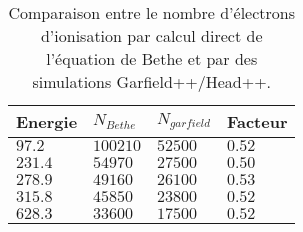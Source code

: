\begin{table}[ht]%
	\centering
	\caption[]
	{Comparaison entre le nombre d'électrons d'ionisation par calcul direct de l'équation de Bethe et par des simulations Garfield++/Head++.}
	\label{sumfr:table:GarfieldBethe}
	\begin{tabularx}{\linewidth}{XXXX}
		\toprule
		Energie    & \(N_{Bethe}\) & \(N_{garfield}\) & Facteur \\
		\midrule
		\(97.2\)  & \(100210\)    & \(52500\)             & \(0.52\)   \\
		\(231.4\) & \(54970\)     & \(27500\)             & \(0.50\)   \\
		\(278.9\) & \(49160\)     & \(26100\)             & \(0.53\)   \\
		\(315.8\) & \(45850\)     & \(23800\)             & \(0.52\)   \\
		\(628.3\) & \(33600\)     & \(17500\)             & \(0.52\)   \\
		\bottomrule
	\end{tabularx}
\end{table}